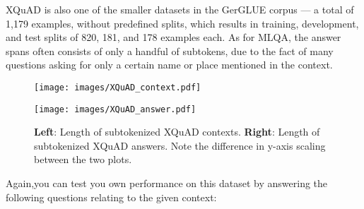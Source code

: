 
XQuAD is also one of the smaller datasets in the GerGLUE corpus --- a total
of 1,179 examples, without predefined splits, which results in training, development, and test
splits of 820, 181, and 178 examples each. As for MLQA, the answer spans often consists of
only a handful of subtokens, due to the fact of many questions asking for only a certain
name or place mentioned in the context.



\begin{figure}
  \begin{minipage}{0.45\linewidth}
  \vspace{0pt}
    \texttt{[image: images/XQuAD\_context.pdf]}
  \end{minipage}
  \hfill
  \begin{minipage}{0.45\linewidth}
  \vspace{0pt}
    \texttt{[image: images/XQuAD\_answer.pdf]}
  \end{minipage}
  \caption[XQuAD Lengths]{\textbf{Left}: Length of subtokenized XQuAD contexts.
                         \textbf{Right}: Length of subtokenized XQuAD answers. Note the difference in y-axis scaling between the two plots.}
  \label{fig:xquad-stats}
\end{figure}

Again,you can test you own performance on this dataset by answering the following questions relating
to the given context:

